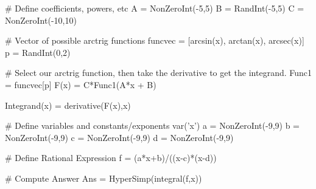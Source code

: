 \begin{sagesilent}
# Define coefficients, powers, etc
A = NonZeroInt(-5,5)
B = RandInt(-5,5)
C = NonZeroInt(-10,10)


# Vector of possible arctrig functions
funcvec = [arcsin(x), arctan(x), arcsec(x)]
p = RandInt(0,2)

# Select our arctrig function, then take the derivative to get the integrand.
Func1 = funcvec[p]
F(x) = C*Func1(A*x + B)

Integrand(x) = derivative(F(x),x)
\end{sagesilent}


\begin{sagesilent}
# Define variables and constants/exponents
var('x')
a = NonZeroInt(-9,9)
b = NonZeroInt(-9,9)
c = NonZeroInt(-9,9)
d = NonZeroInt(-9,9)


# Define Rational Expression
f = (a*x+b)/((x-c)*(x-d))

# Compute Answer
Ans = HyperSimp(integral(f,x))
\end{sagesilent}






